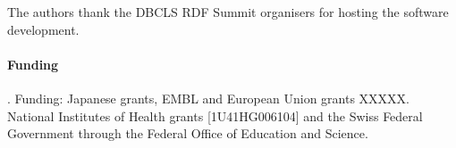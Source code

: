 \documentclass{bioinfo}
\begin{document}
The authors thank the DBCLS RDF Summit organisers for hosting the software development.

\paragraph{Funding\textcolon}.
Funding: Japanese grants, EMBL and European Union grants XXXXX. National Institutes of Health grants [1U41HG006104] and the Swiss Federal Government through the Federal Office of Education and Science.  


%
%
%
%
%
%
%
%
  
\end{document}
